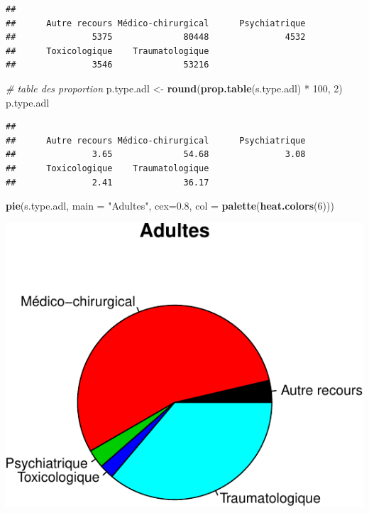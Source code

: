 \documentclass[]{article}
\newenvironment{Shaded}{\begin{snugshade}}{\end{snugshade}}
\newcommand{\KeywordTok}[1]{\textcolor[rgb]{0.13,0.29,0.53}{\textbf{{#1}}}}
\newcommand{\DataTypeTok}[1]{\textcolor[rgb]{0.13,0.29,0.53}{{#1}}}
\newcommand{\DecValTok}[1]{\textcolor[rgb]{0.00,0.00,0.81}{{#1}}}
\newcommand{\FloatTok}[1]{\textcolor[rgb]{0.00,0.00,0.81}{{#1}}}
\newcommand{\StringTok}[1]{\textcolor[rgb]{0.31,0.60,0.02}{{#1}}}
\newcommand{\CommentTok}[1]{\textcolor[rgb]{0.56,0.35,0.01}{\textit{{#1}}}}
\newcommand{\NormalTok}[1]{{#1}}
\begin{document}
\begin{verbatim}
## 
##      Autre recours Médico-chirurgical      Psychiatrique 
##               5375              80448               4532 
##      Toxicologique    Traumatologique 
##               3546              53216
\end{verbatim}

\begin{Shaded}
\begin{Highlighting}[]
\CommentTok{# table des proportion}
\NormalTok{p.type.adl <-}\StringTok{ }\KeywordTok{round}\NormalTok{(}\KeywordTok{prop.table}\NormalTok{(s.type.adl) *}\StringTok{ }\DecValTok{100}\NormalTok{, }\DecValTok{2}\NormalTok{)}
\NormalTok{p.type.adl}
\end{Highlighting}
\end{Shaded}

\begin{verbatim}
## 
##      Autre recours Médico-chirurgical      Psychiatrique 
##               3.65              54.68               3.08 
##      Toxicologique    Traumatologique 
##               2.41              36.17
\end{verbatim}

\begin{Shaded}
\begin{Highlighting}[]
\KeywordTok{pie}\NormalTok{(s.type.adl, }\DataTypeTok{main =} \StringTok{"Adultes"}\NormalTok{, }\DataTypeTok{cex=}\FloatTok{0.8}\NormalTok{, }\DataTypeTok{col =} \KeywordTok{palette}\NormalTok{(}\KeywordTok{heat.colors}\NormalTok{(}\DecValTok{6}\NormalTok{)))}
\end{Highlighting}
\end{Shaded}

\includegraphics{analyse_merge_files/figure-latex/adultes-1.pdf}
\end{document}
